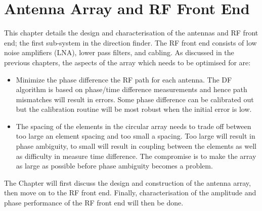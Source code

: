 \chapter{Antenna Array and RF Front End}
\label{ch:rf-front-end}
\graphicspath{{./img/rf-front-end/}}

This chapter details the design and characterisation of the antennas and RF front end; the first sub-system in the direction finder. The RF front end consists of low noise amplifiers (LNA), lower pass filters, and cabling. As discussed in the previous chapters, the aspects of the array which needs to be optimised for are:
\begin{itemize}
  \item Minimize the phase difference the RF path for each antenna. The DF algorithm is based on phase/time difference measurements and hence path mismatches will result in errors. Some phase difference can be calibrated out but the calibration routine will be most robust when the initial error is low.
  \item The spacing of the elements in the circular array needs to trade off between too large an element spacing and too small a spacing. Too large will result in phase ambiguity, to small will result in coupling between the elements as well as difficulty in measure time difference. The compromise is to make the array as large as possible before phase ambiguity becomes a problem.
\end{itemize}

The Chapter will first discuss the design and construction of the antenna array, then move on to the RF front end. Finally, characterisation of the amplitude and phase performance of the RF front end will then be done. 





